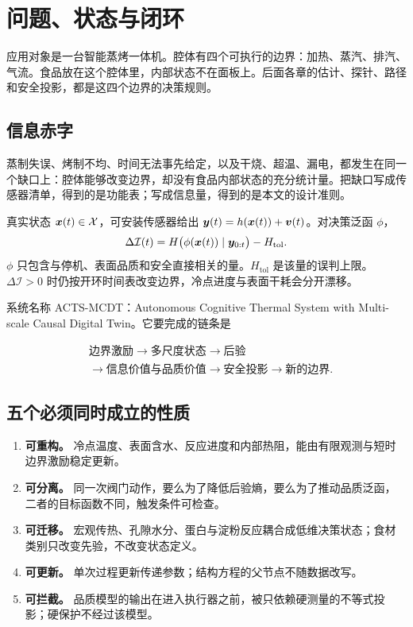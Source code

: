 \chapter{问题、状态与闭环}

应用对象是一台智能蒸烤一体机。腔体有四个可执行的边界：加热、蒸汽、排汽、气流。食品放在这个腔体里，内部状态不在面板上。后面各章的估计、探针、路径和安全投影，都是这四个边界的决策规则。

\section{信息赤字}

蒸制失误、烤制不均、时间无法事先给定，以及干烧、超温、漏电，都发生在同一个缺口上：腔体能够改变边界，却没有食品内部状态的充分统计量。把缺口写成传感器清单，得到的是功能表；写成信息量，得到的是本文的设计准则。

\begin{definition}[热加工信息赤字]
真实状态 $\bm{x}(t)\in\mathcal{X}$，可安装传感器给出 $\bm{y}(t)=h(\bm{x}(t))+\bm{v}(t)$。对决策泛函 $\phi$，
\begin{equation}
\Delta\mathcal{I}(t)=H\big(\phi(\bm{x}(t))\mid \bm{y}_{0:t}\big)-H_{\mathrm{tol}}.
\end{equation}
$\phi$ 只包含与停机、表面品质和安全直接相关的量。$H_{\mathrm{tol}}$ 是该量的误判上限。$\Delta\mathcal{I}>0$ 时仍按开环时间表改变边界，冷点进度与表面干耗会分开漂移。
\end{definition}

系统名称 ACTS-MCDT：Autonomous Cognitive Thermal System with Multi-scale Causal Digital Twin。它要完成的链条是

\[
\begin{aligned}
&\text{边界激励}
\to\text{多尺度状态}
\to\text{后验}\\
&\to\text{信息价值与品质价值}
\to\text{安全投影}
\to\text{新的边界}.
\end{aligned}
\]

\section{五个必须同时成立的性质}

\begin{enumerate}
\item \textbf{可重构。} 冷点温度、表面含水、反应进度和内部热阻，能由有限观测与短时边界激励稳定更新。
\item \textbf{可分离。} 同一次阀门动作，要么为了降低后验熵，要么为了推动品质泛函，二者的目标函数不同，触发条件可检查。
\item \textbf{可迁移。} 宏观传热、孔隙水分、蛋白与淀粉反应耦合成低维决策状态；食材类别只改变先验，不改变状态定义。
\item \textbf{可更新。} 单次过程更新传递参数；结构方程的父节点不随数据改写。
\item \textbf{可拦截。} 品质模型的输出在进入执行器之前，被只依赖硬测量的不等式投影；硬保护不经过该模型。
\end{enumerate}

